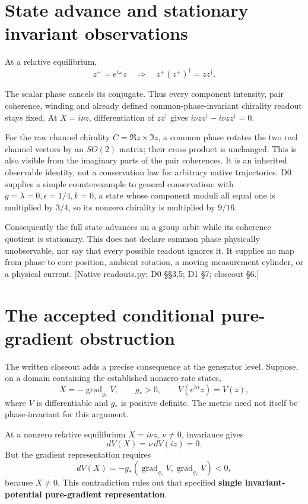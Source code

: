 \documentclass[11pt,a4paper]{article}
\begin{document}
\section{State advance and stationary invariant observations}

At a relative equilibrium,
\[
z^+=e^{i\omega}z\quad\Longrightarrow\quad
\boxed{z^+(z^+)^\dagger=zz^\dagger.}
\tag{D45}\label{eq:D45}
\]

The scalar phase cancels its conjugate. Thus every component intensity, pair coherence, winding and already defined common-phase-invariant chirality readout stays fixed. At \(X=i\nu z\), differentiation of \(zz^\dagger\) gives \(i\nu zz^\dagger-i\nu zz^\dagger=0\).

For the raw channel chirality \(C=\Re z\times\Im z\), a common phase rotates the two real channel vectors by an \(SO(2)\) matrix; their cross product is unchanged. This is also visible from the imaginary parts of the pair coherences. It is an inherited observable identity, not a conservation law for arbitrary native trajectories. D0 supplies a simple counterexample to general conservation: with \(g=\lambda=0,\epsilon=1/4,k=0\), a state whose component moduli all equal one is multiplied by \(3/4\), so its nonzero chirality is multiplied by \(9/16\).

Consequently the full state advances on a group orbit while its coherence quotient is stationary. This does not declare common phase physically unobservable, nor say that every possible readout ignores it. It supplies no map from phase to core position, ambient rotation, a moving measurement cylinder, or a physical current. [Native readouts.py; D0 \S{}\S{}3,5; D1 \S{}7; closeout \S{}6.]

\section{The accepted conditional pure-gradient obstruction}

The written closeout adds a precise consequence at the generator level. Suppose, on a domain containing the established nonzero-rate states,
\[
X=-\operatorname{grad}_{g_*}V,\qquad g_*>0,\qquad
V(e^{i\alpha}z)=V(z),
\tag{D46}\label{eq:D46}
\]
where \(V\) is differentiable and \(g_*\) is positive definite. The metric need not itself be phase-invariant for this argument.

At a nonzero relative equilibrium \(X=i\nu z\), \(\nu\ne0\), invariance gives
\[
dV(X)=\nu\,dV(iz)=0.
\]
But the gradient representation requires
\[
dV(X)=-g_*(\operatorname{grad}_{g_*}V,
\operatorname{grad}_{g_*}V)<0,
\tag{D47}\label{eq:D47}
\]
because \(X\ne0\). This contradiction rules out that specified \textbf{single invariant-potential pure-gradient representation}.
\end{document}
